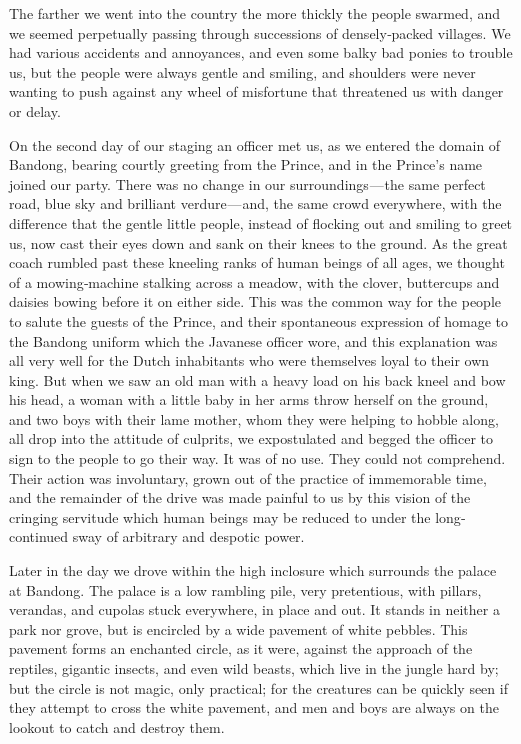 \documentclass[12pt]{book}
\begin{document}
The farther we went into the country the more thickly the people swarmed, and
we seemed perpetually passing through successions of densely‐packed villages.
We had various accidents and annoyances, and even some balky bad ponies to
trouble us, but the people were always gentle and smiling, and shoulders were
never wanting to push against any wheel of misfortune that threatened us with
danger or delay.

On the second day of our staging an officer met us, as we entered the domain
of Bandong, bearing courtly greeting from the Prince, and in the Prince’s name
joined our party. There was no change in our surroundings — the same perfect
road, blue sky and brilliant verdure — and, the same crowd everywhere, with the
difference that the gentle little people, instead of flocking out and smiling to greet
us, now cast their eyes down and sank on their knees to the ground. As the great
coach rumbled past these kneeling ranks of human beings of all ages, we thought
of a mowing‐machine stalking across a meadow, with the clover, buttercups and
daisies bowing before it on either side. This was the common way for the people
to salute the guests of the Prince, and their spontaneous expression of homage to
the Bandong uniform which the Javanese officer wore, and this explanation was
all very well for the Dutch inhabitants who were themselves loyal to their own
king. But when we saw an old man with a heavy load on his back kneel and bow
his head, a woman with a little baby in her arms throw herself on the ground,
and two boys with their lame mother, whom they were helping to hobble along,
all drop into the attitude of culprits, we expostulated and begged the officer to
sign to the people to go their way. It was of no use. They could not comprehend.
Their action was involuntary, grown out of the practice of immemorable time, and
the remainder of the drive was made painful to us by this vision of the cringing
servitude which human beings may be reduced to under the long‐continued sway
of arbitrary and despotic power.

Later in the day we drove within the high inclosure which surrounds the
palace at Bandong. The palace is a low rambling pile, very pretentious, with
pillars, verandas, and cupolas stuck everywhere, in place and out. It stands in
neither a park nor grove, but is encircled by a wide pavement of white pebbles.
This pavement forms an enchanted circle, as it were, against the approach of the
reptiles, gigantic insects, and even wild beasts, which live in the jungle hard by;
but the circle is not magic, only practical; for the creatures can be quickly seen if
they attempt to cross the white pavement, and men and boys are always on the
lookout to catch and destroy them.
\end{document}
